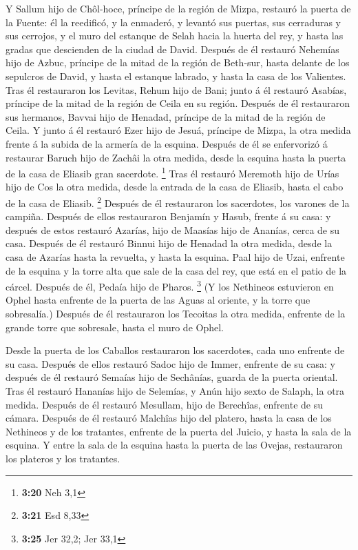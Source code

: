  Y Sallum hijo de Chôl-hoce, príncipe de la región de
Mizpa, restauró la puerta de la Fuente: él la reedificó, y la enmaderó,
y levantó sus puertas, sus cerraduras y sus cerrojos, y el muro del
estanque de Selah hacia la huerta del rey, y hasta las gradas que
descienden de la ciudad de David.  Después de él restauró
Nehemías hijo de Azbuc, príncipe de la mitad de la región de Beth-sur,
hasta delante de los sepulcros de David, y hasta el estanque labrado, y
hasta la casa de los Valientes.  Tras él restauraron los
Levitas, Rehum hijo de Bani; junto á él restauró Asabías, príncipe de la
mitad de la región de Ceila en su región.  Después de él
restauraron sus hermanos, Bavvai hijo de Henadad, príncipe de la mitad
de la región de Ceila.  Y junto á él restauró Ezer hijo de
Jesuá, príncipe de Mizpa, la otra medida frente á la subida de la
armería de la esquina.  Después de él se enfervorizó á
restaurar Baruch hijo de Zachâi la otra medida, desde la esquina hasta
la puerta de la casa de Eliasib gran sacerdote. \footnote{\textbf{3:20}
  Neh 3,1}  Tras él restauró Meremoth hijo de Urías hijo de
Cos la otra medida, desde la entrada de la casa de Eliasib, hasta el
cabo de la casa de Eliasib. \footnote{\textbf{3:21} Esd 8,33}
 Después de él restauraron los sacerdotes, los varones de
la campiña.  Después de ellos restauraron Benjamín y Hasub,
frente á su casa: y después de estos restauró Azarías, hijo de Maasías
hijo de Ananías, cerca de su casa.  Después de él restauró
Binnui hijo de Henadad la otra medida, desde la casa de Azarías hasta la
revuelta, y hasta la esquina.  Paal hijo de Uzai, enfrente
de la esquina y la torre alta que sale de la casa del rey, que está en
el patio de la cárcel. Después de él, Pedaía hijo de Pharos. \footnote{\textbf{3:25}
  Jer 32,2; Jer 33,1}  (Y los Nethineos estuvieron en Ophel
hasta enfrente de la puerta de las Aguas al oriente, y la torre que
sobresalía.)  Después de él restauraron los Tecoitas la
otra medida, enfrente de la grande torre que sobresale, hasta el muro de
Ophel.

 Desde la puerta de los Caballos restauraron los
sacerdotes, cada uno enfrente de su casa.  Después de ellos
restauró Sadoc hijo de Immer, enfrente de su casa: y después de él
restauró Semaías hijo de Sechânías, guarda de la puerta oriental.
 Tras él restauró Hananías hijo de Selemías, y Anún hijo
sexto de Salaph, la otra medida. Después de él restauró Mesullam, hijo
de Berechîas, enfrente de su cámara.  Después de él
restauró Malchîas hijo del platero, hasta la casa de los Nethineos y de
los tratantes, enfrente de la puerta del Juicio, y hasta la sala de la
esquina.  Y entre la sala de la esquina hasta la puerta de
las Ovejas, restauraron los plateros y los tratantes.

